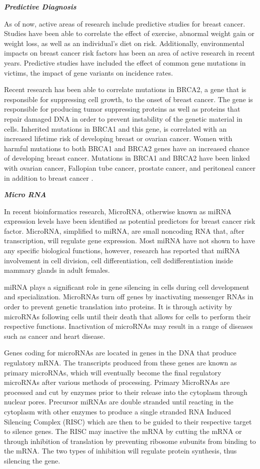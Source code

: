 \documentclass{bioinfo}
\begin{document}
{\textbf {\emph{Predictive Diagnosis}}}

As of now, active areas of research include predictive studies for breast cancer. Studies have been able to correlate the effect of exercise, abnormal weight gain or weight loss, as well as an individual's diet on risk. Additionally, environmental impacts on breast cancer risk factors has been an area of active research in recent years. Predictive studies have included the effect of common gene mutations in victims, the impact of gene variants on incidence rates. 

Recent research has been able to correlate mutations in BRCA2, a gene that is responsible for suppressing cell growth, to the onset of breast cancer. The gene is responsible for producing tumor suppressing proteins as well as proteins that repair damaged DNA in order to prevent instability of the genetic material in cells.  Inherited mutations in BRCA1 and this gene, is correlated with an increased lifetime risk of developing breast or ovarian cancer. Women with harmful mutations to both BRCA1 and BRCA2 genes have an increased chance of developing breast cancer. Mutations in BRCA1 and BRCA2 have been linked with ovarian cancer, Fallopian tube cancer, prostate cancer, and peritoneal cancer in addition to breast cancer \cite{brca}. 


{\textbf {\emph{Micro RNA}}}

In recent bioinformatics research, MicroRNA, otherwise known as miRNA expression levels have been identified as potential predictors for breast cancer risk factor. MicroRNA, simplified to miRNA, are small noncoding RNA that, after transcription, will regulate gene expression. Most miRNA have not shown to have any specific biological functions, however, research has reported that miRNA involvement in  cell division, cell differentiation, cell dedifferentiation inside mammary glands in adult females. \cite{silveri}

miRNA plays a significant role in gene silencing in cells during cell development and specialization. MicroRNAs turn off genes by inactivating messenger RNAs in order to prevent genetic translation into proteins. It is through activity by microRNAs following cells until their death that allows for cells to perform their respective functions. Inactivation of microRNAs may result in a range of diseases such as cancer and heart disease. 

Genes coding for microRNAs are located in genes in the DNA that produce regulatory mRNA. The transcripts produced from these genes are known as primary microRNAs, which will eventually become the final regulatory microRNAs after various methods of processing. Primary MicroRNAs are processed and cut by enzymes prior to their release into the cytoplasm through nuclear pores. Precursor miRNAs are double stranded until reacting in the cytoplasm with other enzymes to produce a single stranded RNA Induced Silencing Complex (RISC) which are then to be guided to their respective target to silence genes. The RISC may inactive the mRNA by cutting the mRNA or through inhibition of translation by preventing ribosome subunits from binding to the mRNA. The two types of inhibition will regulate protein synthesis, thus silencing the gene. \cite{bartel}
\end{document}
